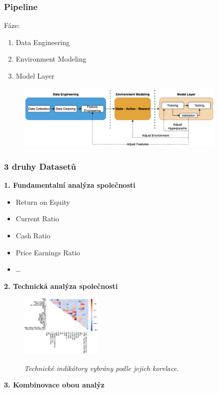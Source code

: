 \begin{frame}
    \frametitle{Pipeline}
    {\Large Fáze:}
    \begin{enumerate}
        \item Data Engineering
        \item Environment Modeling
        \item Model Layer
    \end{enumerate}
    \begin{center}
        \begin{figure}
            \centering
            \includegraphics[width=0.9\textwidth]{img/navrh_reseni}
        \end{figure}
    \end{center}
\end{frame}

\begin{frame}
    \frametitle{3 druhy Datasetů}
    \begin{multicols}{2}
        \begin{center}
            \textbf{1. Fundamentalní analýza společnosti}
            \begin{itemize}
                \item Return on Equity
                \item Current Ratio
                \item Cash Ratio
                \item Price Earnings Ratio
                \item \ldots
            \end{itemize}
        \end{center}
        \columnbreak
        \begin{center}
            \textbf{2. Technická analýza společnosti}
            \begin{figure}
                \centering
                \includegraphics[width=0.35\textwidth]{img/corr}

                \textit{\small Technické indikátory vybrány podle jejich korelace.}
            \end{figure}
        \end{center}
    \end{multicols}
    \textbf{3. Kombinovace obou analýz}
\end{frame}


